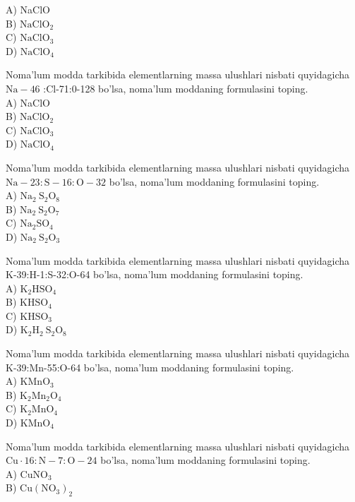 A) NaClO\\
B) $\mathrm{NaClO}_{2}$\\
C) $\mathrm{NaClO}_{3}$\\
D) $\mathrm{NaClO}_{4}$
  \item Noma’lum modda tarkibida elementlarning massa ulushlari nisbati quyidagicha $\mathrm{Na}-46$ :Cl-71:0-128 bo'lsa, noma'lum moddaning formulasini toping.\\
A) NaClO\\
B) $\mathrm{NaClO}_{2}$\\
C) $\mathrm{NaClO}_{3}$\\
D) $\mathrm{NaClO}_{4}$
  \item Noma'lum modda tarkibida elementlarning massa ulushlari nisbati quyidagicha $\mathrm{Na}-23: \mathrm{S}-16: \mathrm{O}-32$ bo'lsa, noma'lum moddaning formulasini toping.\\
A) $\mathrm{Na}_{2} \mathrm{~S}_{2} \mathrm{O}_{8}$\\
B) $\mathrm{Na}_{2} \mathrm{~S}_{2} \mathrm{O}_{7}$\\
C) $\mathrm{Na}_{2} \mathrm{SO}_{4}$\\
D) $\mathrm{Na}_{2} \mathrm{~S}_{2} \mathrm{O}_{3}$
  \item Noma'lum modda tarkibida elementlarning massa ulushlari nisbati quyidagicha K-39:H-1:S-32:O-64 bo'lsa, noma'lum moddaning formulasini toping.\\
A) $\mathrm{K}_{2} \mathrm{HSO}_{4}$\\
B) $\mathrm{KHSO}_{4}$\\
C) $\mathrm{KHSO}_{3}$\\
D) $\mathrm{K}_{2} \mathrm{H}_{2} \mathrm{~S}_{2} \mathrm{O}_{8}$
  \item Noma'lum modda tarkibida elementlarning massa ulushlari nisbati quyidagicha K-39:Mn-55:O-64 bo'lsa, noma'lum moddaning formulasini toping.\\
A) $\mathrm{KMnO}_{3}$\\
B) $\mathrm{K}_{2} \mathrm{Mn}_{2} \mathrm{O}_{4}$\\
C) $\mathrm{K}_{2} \mathrm{MnO}_{4}$\\
D) $\mathrm{KMnO}_{4}$
  \item Noma'lum modda tarkibida elementlarning massa ulushlari nisbati quyidagicha $\mathrm{Cu} \cdot 16: \mathrm{N}-7: \mathrm{O}-24$ bo'lsa, noma'lum moddaning formulasini toping.\\
A) $\mathrm{CuNO}_{3}$\\
B) $\mathrm{Cu}\left(\mathrm{NO}_{3}\right)_{2}$\\
